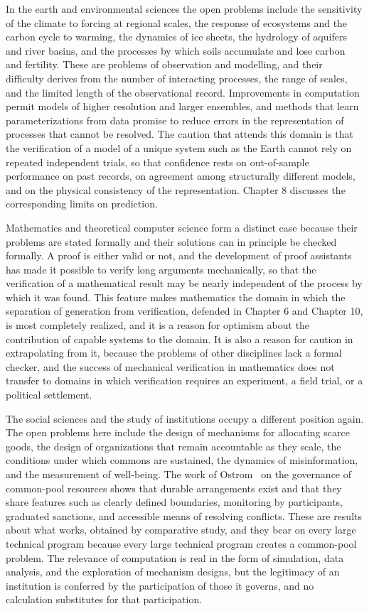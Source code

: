 In the earth and environmental sciences the open problems include the sensitivity of the climate to forcing at regional scales, the response of ecosystems and the carbon cycle to warming, the dynamics of ice sheets, the hydrology of aquifers and river basins, and the processes by which soils accumulate and lose carbon and fertility. These are problems of observation and modelling, and their difficulty derives from the number of interacting processes, the range of scales, and the limited length of the observational record. Improvements in computation permit models of higher resolution and larger ensembles, and methods that learn parameterizations from data promise to reduce errors in the representation of processes that cannot be resolved. The caution that attends this domain is that the verification of a model of a unique system such as the Earth cannot rely on repeated independent trials, so that confidence rests on out-of-sample performance on past records, on agreement among structurally different models, and on the physical consistency of the representation. Chapter 8 discusses the corresponding limits on prediction.

Mathematics and theoretical computer science form a distinct case because their problems are stated formally and their solutions can in principle be checked formally. A proof is either valid or not, and the development of proof assistants has made it possible to verify long arguments mechanically, so that the verification of a mathematical result may be nearly independent of the process by which it was found. This feature makes mathematics the domain in which the separation of generation from verification, defended in Chapter 6 and Chapter 10, is most completely realized, and it is a reason for optimism about the contribution of capable systems to the domain. It is also a reason for caution in extrapolating from it, because the problems of other disciplines lack a formal checker, and the success of mechanical verification in mathematics does not transfer to domains in which verification requires an experiment, a field trial, or a political settlement.

The social sciences and the study of institutions occupy a different position again. The open problems here include the design of mechanisms for allocating scarce goods, the design of organizations that remain accountable as they scale, the conditions under which commons are sustained, the dynamics of misinformation, and the measurement of well-being. The work of Ostrom~\cite{ostrom1990} on the governance of common-pool resources shows that durable arrangements exist and that they share features such as clearly defined boundaries, monitoring by participants, graduated sanctions, and accessible means of resolving conflicts. These are results about what works, obtained by comparative study, and they bear on every large technical program because every large technical program creates a common-pool problem. The relevance of computation is real in the form of simulation, data analysis, and the exploration of mechanism designs, but the legitimacy of an institution is conferred by the participation of those it governs, and no calculation substitutes for that participation.

